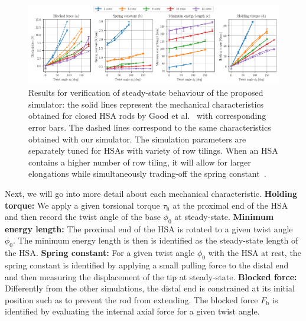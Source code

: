 \begin{figure}[hbt]
    \centering
    \includegraphics[width=\textwidth]{hsamodel/figures/simulation/closed_hsa_rods_verification_v2.pdf}
    \caption{Results for verification of steady-state behaviour of the proposed simulator: the solid lines represent the mechanical characteristics obtained for closed \gls{HSA} rods by Good et al.~\cite{good2022expanding} with corresponding error bars. The dashed lines correspond to the same characteristics obtained with our simulator. The simulation parameters are separately tuned for HSAs with variety of row tilings. When an HSA contains a higher number of row tiling, it will allow for larger elongations while simultaneously trading-off the spring constant~\cite{good2022expanding}.}
    \label{fig:hsamodel:closed_hsa_properties_good_et_al}
\end{figure}

Next, we will go into more detail about each mechanical characteristic.
\textbf{Holding torque:} We apply a given torsional torque $\tau_\mathrm{h}$ at the proximal end of the \gls{HSA} and then record the twist angle of the base $\phi_0$ at steady-state.
\textbf{Minimum energy length:} The proximal end of the \gls{HSA} is rotated to a given twist angle $\phi_0$. The minimum energy length is then is identified as the steady-state length of the \gls{HSA}.
\textbf{Spring constant:} For a given twist angle $\phi_0$ with the \gls{HSA} at rest, the spring constant is identified by applying a small pulling force to the distal end and then measuring the displacement of the tip at steady-state.
\textbf{Blocked force:} Differently from the other simulations, the distal end is constrained at its initial position such as to prevent the rod from extending. The blocked force $F_\mathrm{b}$ is identified by evaluating the internal axial force for a given twist angle.


